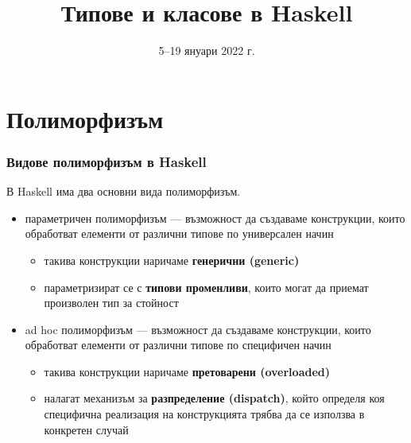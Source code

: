 \documentclass[alsotrans]{beamerswitch}
\title{Типове и класове в Haskell}
\date{5--19 януари 2022 г.}
\begin{document}
\begin{frame}
  \titlepage
\end{frame}

\section{Полиморфизъм}

\begin{frame}
  \frametitle{Видове полиморфизъм в Haskell}

  В Haskell има два основни вида полиморфизъм.
  \begin{itemize}[<+->]
  \item \alert{параметричен полиморфизъм} --- възможност да създаваме конструкции, които обработват елементи от различни типове по \alert{универсален} начин
    \begin{itemize}
    \item такива конструкции наричаме \textbf{генерични (generic)}
    \item параметризират се  с \textbf{типови променливи}, които могат да приемат произволен тип за стойност
    \end{itemize}
  \item \alert{ad hoc полиморфизъм} --- възможност да създаваме конструкции, които обработват елементи от различни типове по \alert{специфичен} начин
    \begin{itemize}
    \item такива конструкции наричаме \textbf{претоварени (overloaded)}
    \item налагат механизъм за \textbf{разпределение (dispatch)}, който определя коя специфична реализация на конструкцията трябва да се използва в конкретен случай
    \end{itemize}
  \end{itemize}
\end{frame}
\end{document}
